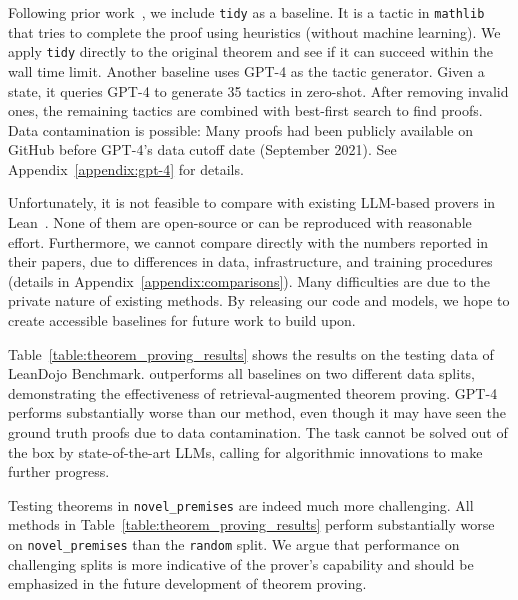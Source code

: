 



Following prior work~\cite{han2022proof,zheng2022minif2f}, we include \texttt{tidy} as a baseline. It is a tactic in \texttt{mathlib} that tries to complete the proof using heuristics (without machine learning). We apply \texttt{tidy} directly to the original theorem and see if it can succeed within the wall time limit. Another baseline uses GPT-4 as the tactic generator. Given a state, it queries GPT-4 to generate 35 tactics in zero-shot. After removing invalid ones, the remaining tactics are combined with best-first search to find proofs. Data contamination is possible: Many proofs had been publicly available on GitHub before GPT-4's data cutoff date (September 2021). See Appendix~\ref{appendix:gpt-4} for details.

Unfortunately, it is not feasible to compare with existing LLM-based provers in Lean~\cite{han2022proof,polu2023formal,lample2022hypertree}. None of them are open-source or can be reproduced with reasonable effort. Furthermore, we cannot compare directly with the numbers reported in their papers, due to differences in data, infrastructure, and training procedures (details in Appendix~\ref{appendix:comparisons}). Many difficulties are due to the private nature of existing methods. By releasing our code and models, we hope to create accessible baselines for future work to build upon.





Table~\ref{table:theorem_proving_results} shows the results on the testing data of LeanDojo Benchmark. {\name} outperforms all baselines on two different data splits, demonstrating the effectiveness of retrieval-augmented theorem proving. GPT-4 performs substantially worse than our method, even though it may have seen the ground truth proofs due to data contamination. The task cannot be solved out of the box by state-of-the-art LLMs, calling for algorithmic innovations to make further progress.

Testing theorems in \texttt{novel\_premises} are indeed much more challenging. All methods in Table~\ref{table:theorem_proving_results} perform substantially worse on \texttt{novel\_premises} than the \texttt{random} split. We argue that performance on challenging splits is more indicative of the prover's capability and should be emphasized in the future development of theorem proving.


